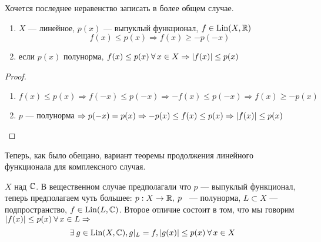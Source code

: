 \documentclass[document]{subfiles}
\begin{document}
Хочется последнее неравенство записать в более общем случае.
\begin{statement}
    \begin{enumerate}       
        \item $X$ --- линейное, $p(x)$ --- выпуклый функционал, $f \in \operatorname{Lin}(X, \mathbb{R})$
        \[ f(x) \leq p(x) \Rightarrow f(x) \geq -p(-x) \] 
        \item если $p(x)$ полунорма, $f(x) \leq p(x) \: \forall x \in X \Rightarrow \abs{f(x)} \leq p(x)$
    \end{enumerate}
\end{statement}

\begin{proof}
    \begin{enumerate}
        \item $f(x) \leq p(x) \Rightarrow f(-x) \leq p(-x) \Rightarrow -f(x) \leq p(-x) \Rightarrow f(x) \geq -p(x) $
        \item $p$ --- полунорма $\Rightarrow p(-x) = p(x) \Rightarrow -p(x) \leq f(x) \leq p(x) \Rightarrow \left| {f(x)} \right| \leq p(x)$
    \end{enumerate}
\end{proof}

Теперь, как было обещано, вариант теоремы продолжения линейного функционала для комплексного случая.

\begin{theorem}
    $X$ над $\mathbb{C}$. В вещественном случае предполагали что $p$ --- выпуклый функционал, теперь предполагаем чуть большее: $p: X \rightarrow \mathbb{R}, \: p$ ~--- полунорма,
    $L \subset X$ --- подпространство, $f \in \operatorname{Lin}(L, \mathbb{C})$. Второе отличие состоит в том, что мы говорим $\abs{f(x)} \leq p(x) \: \forall x \in L \Rightarrow$ 
    \[ \exists g \in \Lin(X, \bC), g |_L = f, \abs{g(x)} \leq p(x) \: \forall x \in X \]
\end{theorem}
\end{document}
